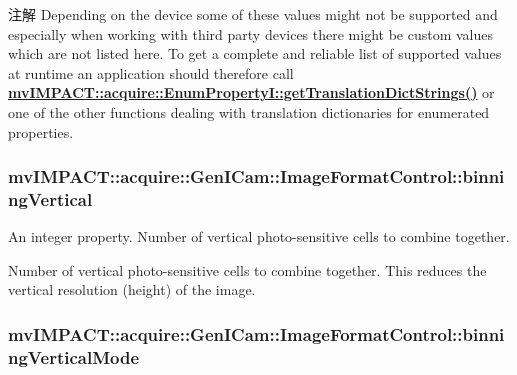 \begin{DoxyNote}{注解}
Depending on the device some of these values might not be supported and especially when working with third party devices there might be custom values which are not listed here. To get a complete and reliable list of supported values at runtime an application should therefore call {\bfseries \hyperlink{classmv_i_m_p_a_c_t_1_1acquire_1_1_enum_property_i_a0ba6ccbf5ee69784d5d0b537924d26b6}{mv\+I\+M\+P\+A\+C\+T\+::acquire\+::\+Enum\+Property\+I\+::get\+Translation\+Dict\+Strings()}} or one of the other functions dealing with translation dictionaries for enumerated properties. 
\end{DoxyNote}
\hypertarget{classmv_i_m_p_a_c_t_1_1acquire_1_1_gen_i_cam_1_1_image_format_control_ac766f2fc87ea58efeb031ccdd83d204a}{
\subsubsection[{binning\+Vertical}]{ mv\+I\+M\+P\+A\+C\+T\+::acquire\+::\+Gen\+I\+Cam\+::\+Image\+Format\+Control\+::binning\+Vertical}}\label{classmv_i_m_p_a_c_t_1_1acquire_1_1_gen_i_cam_1_1_image_format_control_ac766f2fc87ea58efeb031ccdd83d204a}


An integer property. Number of vertical photo-\/sensitive cells to combine together. 

Number of vertical photo-\/sensitive cells to combine together. This reduces the vertical resolution (height) of the image. \hypertarget{classmv_i_m_p_a_c_t_1_1acquire_1_1_gen_i_cam_1_1_image_format_control_aa0da18196345e5cfa2a106b143afd777}{
\subsubsection[{binning\+Vertical\+Mode}]{ mv\+I\+M\+P\+A\+C\+T\+::acquire\+::\+Gen\+I\+Cam\+::\+Image\+Format\+Control\+::binning\+Vertical\+Mode}}\label{classmv_i_m_p_a_c_t_1_1acquire_1_1_gen_i_cam_1_1_image_format_control_aa0da18196345e5cfa2a106b143afd777}


